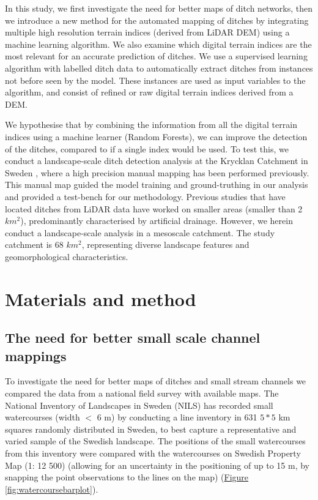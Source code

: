 \documentclass[]{interact}
\theoremstyle{plain}%
\theoremstyle{definition}
\theoremstyle{remark}
\begin{document}
In this study, we first investigate the need for better maps of ditch networks, then we introduce a new method for the automated mapping of ditches by integrating multiple high resolution terrain indices (derived from LiDAR DEM) using a machine learning algorithm. We also examine which digital terrain indices are the most relevant for an accurate prediction of ditches. We use a supervised learning algorithm with labelled ditch data to automatically extract ditches from instances not before seen by the model. These instances are used as input variables to the algorithm, and consist of refined or raw digital terrain indices derived from a DEM.

We hypothesise that by combining the information from all the digital terrain indices using a machine learner (Random Forests), we can improve the detection of the ditches, compared to if a single index would be used. To test this, we conduct a landscape-scale ditch detection analysis at the Krycklan Catchment in Sweden \citep{krycklancatchment}, where a high precision manual mapping has been performed previously. This manual map guided the model training and ground-truthing in our analysis and provided a test-bench for our methodology. Previous studies \citep{roelens, bailly, rapinel, kiss} that have located ditches from LiDAR data have worked on smaller areas (smaller than 2 $km^2$), predominantly characterised by artificial drainage. However, we herein conduct a landscape-scale analysis in a mesoscale catchment. The study  catchment  is 68 $km^2$, representing diverse landscape features and geomorphological characteristics.

\section{Materials and method}
\label{method}

\subsection{The need for better small scale channel mappings}
To investigate the need for better maps of ditches and small stream channels we compared the data from a national field survey with available maps. The National Inventory of Landscapes in Sweden (NILS) has recorded small watercourses (width $<$ 6 m) by conducting a line inventory in 631 $5*5$ km squares randomly distributed in Sweden, to best capture a representative and varied sample of the Swedish landscape. The positions of the small watercourses from this inventory were compared with the watercourses on Swedish Property Map (1: 12 500) (allowing for an uncertainty in the positioning of up to 15 m, by snapping the point observations to the lines on the map) (\hyperref[fig:watercoursebarplot]{Figure} \ref{fig:watercoursebarplot}).
\end{document}
